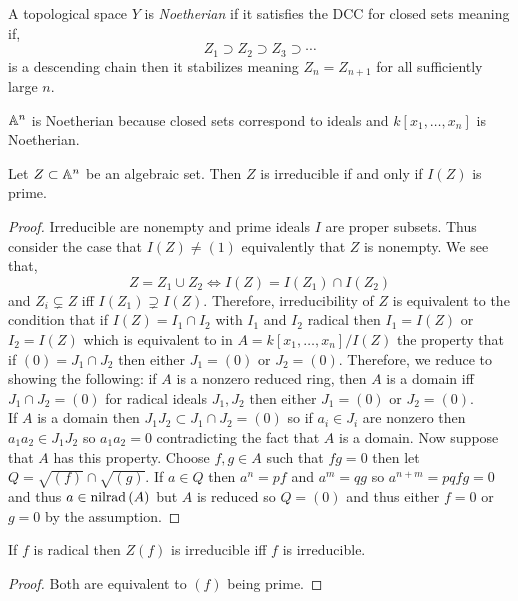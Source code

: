 \documentclass[12pt]{article}
\begin{document}
\begin{defn}
A topological space $Y$ is \textit{Noetherian} if it satisfies the DCC for closed sets meaning if,
\[ Z_1 \supset Z_2 \supset Z_3 \supset \cdots \]
is a descending chain then it stabilizes meaning $Z_n = Z_{n + 1}$ for all sufficiently large $n$.
\end{defn}

\begin{example}
$\mathbb{A}^n$ is Noetherian because closed sets correspond to ideals and $k[x_1, \dots, x_n]$ is Noetherian.
\end{example}

\begin{prop}
Let $Z \subset \mathbb{A}^n$ be an algebraic set. Then $Z$ is irreducible if and only if $I(Z)$ is prime.
\end{prop}

\begin{proof}
Irreducible are nonempty and prime ideals $I$ are proper subsets. Thus consider the case that $I(Z) \neq (1)$ equivalently that $Z$ is nonempty. We see that,
\[ Z = Z_1 \cup Z_2 \iff I(Z) = I(Z_1) \cap I(Z_2) \]
and $Z_i \subsetneq Z$ iff $I(Z_1) \supsetneq I(Z)$. Therefore, irreducibility of $Z$ is equivalent to the condition that if $I(Z) = I_1 \cap I_2$ with $I_1$ and $I_2$ radical then $I_1 = I(Z)$ or $I_2 = I(Z)$ which is equivalent to in $A = k[x_1, \dots, x_n] / I(Z)$ the property that if $(0) = J_1 \cap J_2$ then either $J_1 = (0)$ or $J_2 = (0)$. Therefore, we reduce to showing the following: if $A$ is a nonzero reduced ring, then $A$ is a domain iff $J_1 \cap J_2 = (0)$ for radical ideals $J_1, J_2$ then either $J_1 = (0)$ or $J_2 = (0)$.
\bigskip\\
If $A$ is a domain then $J_1 J_2 \subset J_1 \cap J_2 = (0)$ so if $a_i \in J_i$ are nonzero then $a_1 a_2 \in J_1 J_2$ so $a_1 a_2 = 0$ contradicting the fact that $A$ is a domain. Now suppose that $A$ has this property. Choose $f,g \in A$ such that $fg = 0$ then let $Q = \sqrt{(f)} \cap \sqrt{(g)}$. If $a \in Q$ then $a^n = pf$ and $a^m = qg$ so $a^{n+m} = pq fg = 0$ and thus $a \in \mathrm{nilrad}\left( A \right)$ but $A$ is reduced so $Q = (0)$ and thus either $f = 0$ or $g = 0$ by the assumption.
\end{proof}

\begin{cor}
If $f$ is radical then $Z(f)$ is irreducible iff $f$ is irreducible.
\end{cor}

\begin{proof}
Both are equivalent to $(f)$ being prime.
\end{proof}
\end{document}
